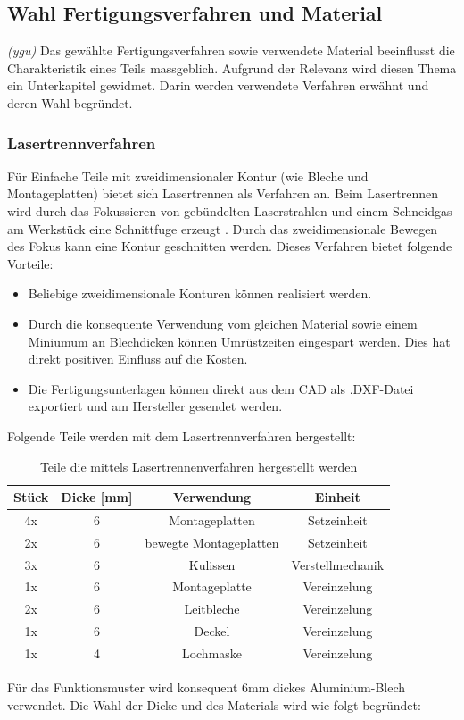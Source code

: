 \subsection{Wahl Fertigungsverfahren und Material}
\textit{(ygu)} Das gewählte Fertigungsverfahren sowie verwendete Material beeinflusst die Charakteristik eines Teils massgeblich. Aufgrund der Relevanz wird diesen Thema ein Unterkapitel gewidmet. Darin werden verwendete Verfahren erwähnt und deren Wahl begründet.

\subsubsection{Lasertrennverfahren}
Für Einfache Teile mit zweidimensionaler Kontur (wie Bleche und Montageplatten) bietet sich Lasertrennen als Verfahren an. Beim Lasertrennen wird durch das Fokussieren von gebündelten Laserstrahlen und einem Schneidgas am Werkstück eine Schnittfuge erzeugt \cite{laser}. Durch das zweidimensionale Bewegen des Fokus kann eine Kontur geschnitten werden. Dieses Verfahren bietet folgende Vorteile:

\begin{itemize}
	\item Beliebige zweidimensionale Konturen können realisiert werden.
	
	\item Durch die konsequente Verwendung vom gleichen Material sowie einem Miniumum an Blechdicken können Umrüstzeiten eingespart werden. Dies hat direkt positiven Einfluss auf die Kosten.
	
	\item Die Fertigungsunterlagen können direkt aus dem CAD als .DXF-Datei exportiert und am Hersteller gesendet werden. 
\end{itemize}
Folgende Teile werden mit dem Lasertrennverfahren hergestellt:

\begin{table}[H]
\begin{tabular}{|c|c|c|c|}
	\hline 
	Stück & Dicke [mm] & Verwendung & Einheit \\ 
	\hline 
	4x & 6 &Montageplatten & Setzeinheit \\ 
	\hline 
	2x & 6 & bewegte Montageplatten & Setzeinheit \\ 
	\hline 
	3x & 6 & Kulissen & Verstellmechanik \\ 
	\hline 
	1x & 6 & Montageplatte & Vereinzelung \\ 
	\hline 
	2x & 6 & Leitbleche  & Vereinzelung \\ 
	\hline 
	1x & 6 & Deckel & Vereinzelung \\ 
	\hline 
	1x & 4 & Lochmaske & Vereinzelung  \\ 
	\hline 
\end{tabular}
	\caption{Teile die mittels Lasertrennenverfahren hergestellt werden}
	\label{tab:lasertrennen}
\end{table} 
Für das Funktionsmuster wird konsequent 6mm dickes Aluminium-Blech verwendet. Die Wahl der Dicke und des Materials wird wie folgt begründet:

